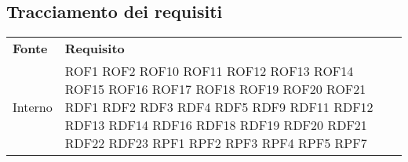 \subsection{Tracciamento dei requisiti}
\begin{longtable}{| p{5cm} | p{5cm} |}
		\rowcolor{LightBlue}
		\color{white}\bfseries Fonte & \color{white}\bfseries Requisito \\[0.25cm]
		Interno & 	ROF1 \newline
					ROF2 \newline
					ROF10 \newline
					ROF11 \newline
					ROF12 \newline
					ROF13 \newline
					ROF14 \newline
					ROF15 \newline
					ROF16 \newline
					ROF17 \newline
					ROF18 \newline
					ROF19 \newline
					ROF20 \newline
					ROF21 \newline
					RDF1 \newline
					RDF2 \newline
					RDF3 \newline
					RDF4 \newline
					RDF5 \newline
					RDF9 \newline
					RDF11 \newline
					RDF12 \newline
					RDF13 \newline
					RDF14 \newline
					RDF16 \newline
					RDF18 \newline
					RDF19 \newline
					RDF20 \newline
					RDF21 \newline
					RDF22 \newline
					RDF23 \newline
					RPF1 \newline
					RPF2 \newline
					RPF3 \newline
					RPF4 \newline
					RPF5 \newline
					RPF7 \newline

\end{longtable}
